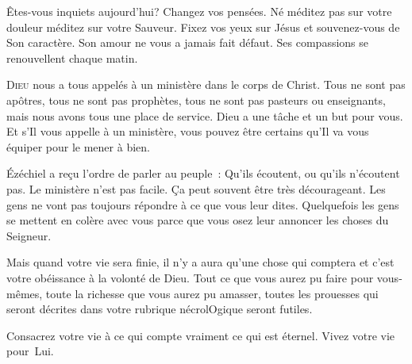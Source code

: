 Êtes-vous inquiets aujourd'hui? Changez vos pensées.
 Né méditez pas sur votre douleur \ocadr méditez sur votre Sauveur.
 Fixez vos yeux sur Jésus et souvenez-vous de Son caractère.
 Son amour ne vous a jamais fait défaut.
 Ses compassions se renouvellent chaque matin. 

\dvrule







\lettrine{D}{ieu} nous a tous appelés à un ministère
 dans le corps de Christ. Tous ne sont pas apôtres,
 tous ne sont pas prophètes, tous ne sont pas pasteurs ou enseignants,
 mais nous avons tous une place de service.
 Dieu a une tâche et un but pour vous.
 Et s'Il vous appelle à un ministère, vous pouvez être certains
 qu'Il va vous équiper pour le mener à bien. 


Ézéchiel a re\c{c}u l'ordre de parler au peuple~: 
 \Og Qu'ils écoutent, ou qu'ils n'écoutent pas. \Fg{}
 Le ministère n'est pas facile. Ça peut souvent être très décourageant.
 Les gens ne vont pas toujours répondre à ce que vous leur dites.
 Quelquefois les gens se mettent en colère avec vous parce que vous osez
 leur annoncer les choses du Seigneur. 

Mais quand votre vie sera finie, il n'y a aura qu'une chose qui comptera 
 \ocadr et c'est votre obéissance à la volonté de Dieu.
 Tout ce que vous aurez pu faire pour vous-mêmes, toute la richesse
 que vous aurez pu amasser, toutes les prouesses qui seront décrites
 dans votre rubrique nécrolOgique seront futiles. 

Consacrez votre vie à ce qui compte vraiment
 \ocadr ce qui est éternel. Vivez votre vie pour~Lui. 

\dvrule


